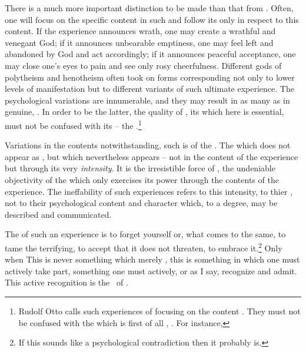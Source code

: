 \pa\label{pa:contNothing} There is a much more important distinction
to be made than that from .  Often, one will
focus on the specific content in such  and follow
its  only in respect to this content.  If the experience
announces wrath, one may create a wrathful and venegant God; if it
announces unbearable emptiness, one may feel left and abandoned by God
and act accordingly; if it announces peaceful acceptance, one may
close one's eyes to pain and see only rosy cheerfulness.  Different
gods of polytheism and henotheism often took on forms corresponding
not only to lower levels of manifestation but to different variants of
such ultimate experience.  The psychological variations are
innumerable, and they may result in as many  as in genuine,
.  In order to be the latter, the quality of
, its  which here is essential, must not
be confused with its  -- the .\footnote{Rudolf Otto calls such experiences of
 focusing on the content .  They
must not be confused with the  which is first of all 
, .  For instance, }

Variations in the  contents notwithstanding, such  is  of the .  The  which
does not appear as , but which nevertheless
appears -- not in the content of the experience but through its very
{\em intensity}.  It is the irresistible force of ,
the undeniable objectivity of the  which only exercises
its power through the  contents of the experience.  The
ineffability of such experiences refers to this intensity, to thier
, not to their psychological content and character
which, to a degree, may be described and communicated.

\pa
The  of such an experience is to forget yourself or, 
what comes to the same, to tame the terrifying, to accept that it does 
not threaten, to embrace it.\footnote{If this sounds like a 
psychological contradiction then it probably is. }
Only when  This is never something which
merely , this is something in which one must
actively take part, something one must actively, or as I say,
 recognize and admit.  This active recognition is the
\sch\ of \yes.


